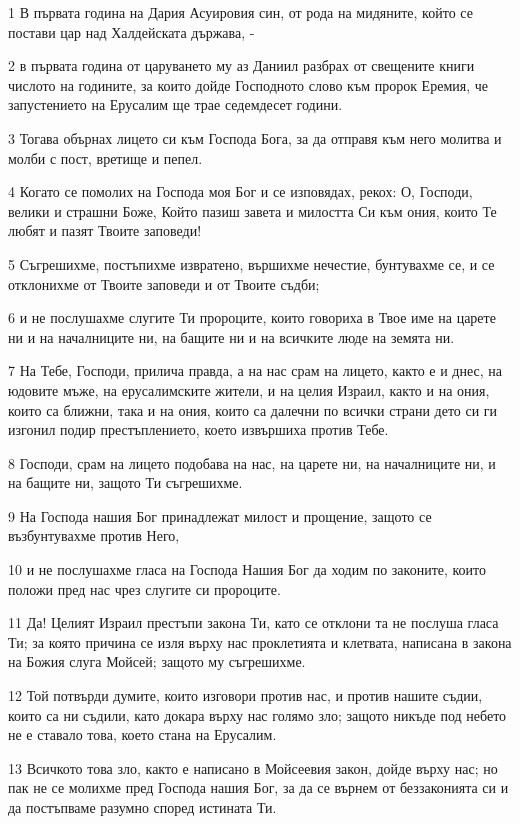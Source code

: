 \par 1 В първата година на Дария Асуировия син, от рода на мидяните, който се постави цар над Халдейската държава, -
\par 2 в първата година от царуването му аз Даниил разбрах от свещените книги числото на годините, за които дойде Господното слово към пророк Еремия, че запустението на Ерусалим ще трае седемдесет години.
\par 3 Тогава обърнах лицето си към Господа Бога, за да отправя към него молитва и молби с пост, вретище и пепел.
\par 4 Когато се помолих на Господа моя Бог и се изповядах, рекох: О, Господи, велики и страшни Боже, Който пазиш завета и милостта Си към ония, които Те любят и пазят Твоите заповеди!
\par 5 Съгрешихме, постъпихме извратено, вършихме нечестие, бунтувахме се, и се отклонихме от Твоите заповеди и от Твоите съдби;
\par 6 и не послушахме слугите Ти пророците, които говориха в Твое име на царете ни и на началниците ни, на бащите ни и на всичките люде на земята ни.
\par 7 На Тебе, Господи, прилича правда, а на нас срам на лицето, както е и днес, на юдовите мъже, на ерусалимските жители, и на целия Израил, както и на ония, които са ближни, така и на ония, които са далечни по всички страни дето си ги изгонил подир престъплението, което извършиха против Тебе.
\par 8 Господи, срам на лицето подобава на нас, на царете ни, на началниците ни, и на бащите ни, защото Ти съгрешихме.
\par 9 На Господа нашия Бог принадлежат милост и прощение, защото се възбунтувахме против Него,
\par 10 и не послушахме гласа на Господа Нашия Бог да ходим по законите, които положи пред нас чрез слугите си пророците.
\par 11 Да! Целият Израил престъпи закона Ти, като се отклони та не послуша гласа Ти; за която причина се изля върху нас проклетията и клетвата, написана в закона на Божия слуга Мойсей; защото му съгрешихме.
\par 12 Той потвърди думите, които изговори против нас, и против нашите съдии, които са ни съдили, като докара върху нас голямо зло; защото никъде под небето не е ставало това, което стана на Ерусалим.
\par 13 Всичкото това зло, както е написано в Мойсеевия закон, дойде върху нас; но пак не се молихме пред Господа нашия Бог, за да се върнем от беззаконията си и да постъпваме разумно според истината Ти.
